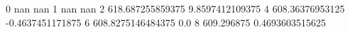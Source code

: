 0 nan nan
1 nan nan
2 618.687255859375 9.8597412109375
4 608.36376953125 -0.4637451171875
6 608.8275146484375 0.0
8 609.296875 0.4693603515625
